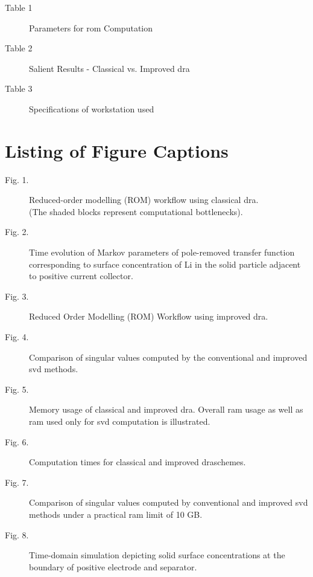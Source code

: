 \begin{description}
	\item[Table 1]   Parameters for \gls{rom} Computation\\
	\item[Table 2]   Salient Results - Classical vs. Improved \gls{dra}\\
	\item[Table 3]   Specifications of workstation used
\end{description}
\newpage
\section*{Listing of Figure Captions}

\begin{description}
	\item[Fig. 1.]   Reduced-order modelling (ROM) workflow using classical \gls{dra}.\\ (The shaded blocks represent computational bottlenecks).\\
	\item[Fig. 2.]   Time evolution of Markov parameters of pole-removed transfer function corresponding to surface concentration of Li in the solid particle adjacent to positive current collector.\\
	\item[Fig. 3.]   Reduced Order Modelling (ROM) Workflow using improved \gls{dra}.\\
	\item[Fig. 4.]   Comparison of singular values computed by the conventional and improved \gls{svd} methods.\\
	\item[Fig. 5.]	 Memory usage of classical and improved \gls{dra}. Overall \gls{ram} usage as well as \gls{ram} used only for \gls{svd} computation is illustrated.\\
	\item[Fig. 6.] 	 Computation times for classical and improved \gls{dra}schemes.\\
	\item[Fig. 7.]	 Comparison of singular values computed by conventional and improved \gls{svd} methods under a practical \gls{ram} limit of 10 GB.\\
	\item[Fig. 8.]	 Time-domain simulation depicting solid surface concentrations at the boundary of positive electrode and separator.\\
\end{description}

